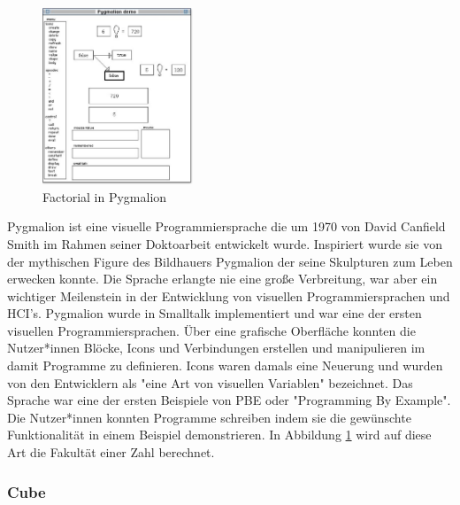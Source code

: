 \documentclass[ngerman]{article}
\begin{document}
\begingroup
\setlength\intextsep{2pt}

\begin{minipage}{\linewidth}


\begin{figure}
  \centering
  \includegraphics[width=0.4\textwidth]{./graphics/pygmalion.jpg} %
  \caption{Factorial in Pygmalion \cite{smith1975pygmalion}}
  \label{fig:pygmalion_demo}
\end{figure}

Pygmalion ist eine visuelle Programmiersprache die um 1970 von David Canfield Smith im Rahmen seiner Doktoarbeit entwickelt wurde. Inspiriert wurde sie von der mythischen Figure des Bildhauers Pygmalion der seine Skulpturen zum Leben erwecken konnte.
Die Sprache erlangte nie eine große Verbreitung, war aber ein wichtiger Meilenstein in der Entwicklung von visuellen Programmiersprachen und HCI's.
Pygmalion wurde in Smalltalk implementiert und war eine der ersten visuellen Programmiersprachen. Über eine grafische Oberfläche konnten die Nutzer*innen Blöcke, Icons und Verbindungen erstellen und manipulieren im damit Programme zu definieren.
Icons waren damals eine Neuerung und wurden von den Entwicklern als "eine Art von visuellen Variablen" bezeichnet. 
Das Sprache war eine der ersten Beispiele von PBE oder "Programming By Example".
Die Nutzer*innen konnten Programme schreiben indem sie die gewünschte Funktionalität in einem Beispiel demonstrieren. 
In Abbildung \ref{fig:pygmalion_demo} wird auf diese Art die Fakultät einer Zahl berechnet. 
\end{minipage}
\endgroup

\pagebreak

\subsubsection{Cube}
 \cite{najork1996programming}
\linebreak
\linebreak
\end{document}
